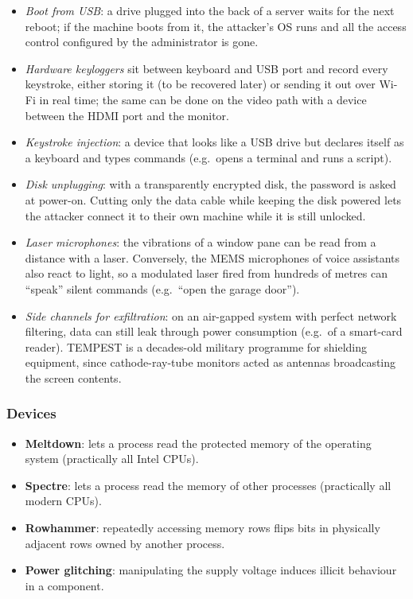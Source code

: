 \begin{example}
\leavevmode
\begin{itemize}
    \item \emph{Boot from USB}: a drive plugged into the back of a server waits for the next reboot; if the machine boots from it, the attacker's OS runs and all the access control configured by the administrator is gone.
    \item \emph{Hardware keyloggers} sit between keyboard and USB port and record every keystroke, either storing it (to be recovered later) or sending it out over Wi-Fi in real time; the same can be done on the video path with a device between the HDMI port and the monitor.
    \item \emph{Keystroke injection}: a device that looks like a USB drive but declares itself as a keyboard and types commands (e.g.\ opens a terminal and runs a script).
    \item \emph{Disk unplugging}: with a transparently encrypted disk, the password is asked at power-on. Cutting only the data cable while keeping the disk powered lets the attacker connect it to their own machine while it is still unlocked.
    \item \emph{Laser microphones}: the vibrations of a window pane can be read from a distance with a laser. Conversely, the MEMS microphones of voice assistants also react to light, so a modulated laser fired from hundreds of metres can \enquote{speak} silent commands (e.g.\ \enquote{open the garage door}).
    \item \emph{Side channels for exfiltration}: on an air-gapped system with perfect network filtering, data can still leak through power consumption (e.g.\ of a smart-card reader). TEMPEST is a decades-old military programme for shielding equipment, since cathode-ray-tube monitors acted as antennas broadcasting the screen contents.
\end{itemize}
\end{example}

\subsubsection{Devices}
\begin{itemize}
    \item \textbf{Meltdown}: lets a process read the protected memory of the operating system (practically all Intel CPUs).
    \item \textbf{Spectre}: lets a process read the memory of other processes (practically all modern CPUs).
    \item \textbf{Rowhammer}: repeatedly accessing memory rows flips bits in physically adjacent rows owned by another process.
    \item \textbf{Power glitching}: manipulating the supply voltage induces illicit behaviour in a component.
\end{itemize}

